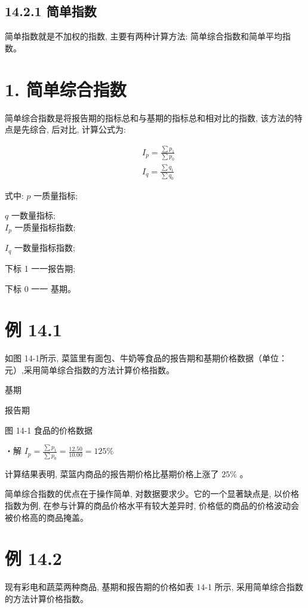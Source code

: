 \documentclass[10pt]{article}
\begin{document}
\begin{CJK*}{UTF8}{bsmi}
\subsection*{14.2.1 简单指数}
简单指数就是不加权的指数, 主要有两种计算方法: 简单综合指数和简单平均指数。

\section*{1. 简单综合指数}
简单综合指数是将报告期的指标总和与基期的指标总和相对比的指数, 该方法的特点是先综合, 后对比, 计算公式为:


\begin{align*}
& I_{p}=\frac{\sum p_{1}}{\sum p_{0}}  \tag{14.1}\\
& I_{q}=\frac{\sum q_{1}}{\sum q_{0}} \tag{14.2}
\end{align*}


式中: $p$ 一质量指标;

$q$ 一数量指标;\\
$I_{p}$ 一质量指标指数;

$I_{q}$ 一数量指标指数;

下标 1 一一报告期;

下标 0 一一 基期。

\section*{例 14.1}
如图 14-1所示, 菜篮里有面包、牛奶等食品的报告期和基期价格数据（单位：元）,采用简单综合指数的方法计算价格指数。

\begin{center}
\end{center}

基期

\begin{center}
\end{center}

报告期

图 14-1 食品的价格数据

・解 $I_{p}=\frac{\sum p_{1}}{\sum p_{0}}=\frac{12.50}{10.00}=125 \%$

计算结果表明, 菜篮内商品的报告期价格比基期价格上涨了 $25 \%$ 。

简单综合指数的优点在于操作简单, 对数据要求少。它的一个显著缺点是, 以价格指数为例, 在参与计算的商品价格水平有较大差异时, 价格低的商品的价格波动会被价格高的商品掩盖。

\section*{例 14.2}
现有彩电和蔬菜两种商品, 基期和报告期的价格如表 14-1 所示, 采用简单综合指数的方法计算价格指数。


\end{CJK*}
\end{document}

